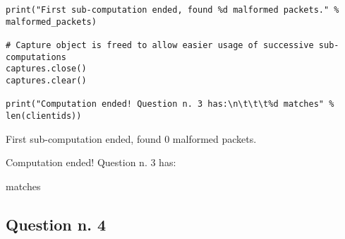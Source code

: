 \documentclass[a4paper,11pt]{article} %
\begin{document}
\begin{verbatim}
print("First sub-computation ended, found %d malformed packets." % malformed_packets)

# Capture object is freed to allow easier usage of successive sub-computations
captures.close()
captures.clear()

print("Computation ended! Question n. 3 has:\n\t\t\t%d matches" % len(clientids))
    \end{verbatim}

    \begin{tcolorbox}
        First sub-computation ended, found 0 malformed packets.

        Computation ended! Question n. 3 has:

        \qquad \qquad {} matches
    \end{tcolorbox}

    \subsection{Question n. 4}\label{subsec:question-n.-4}
\end{document}
